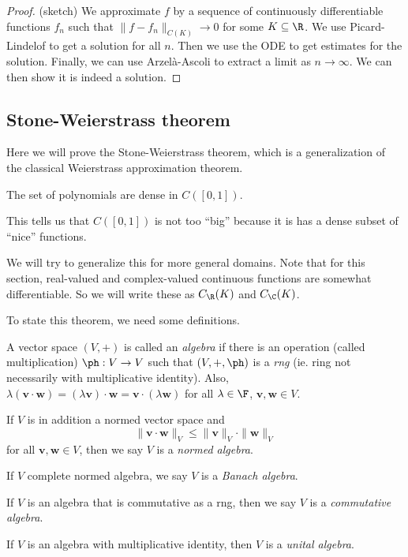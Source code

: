 \documentclass[a4paper]{article}
\begin{document}
\begin{proof}(sketch)
  We approximate $f$ by a sequence of continuously differentiable functions $f_n$ such that $\|f - f_n\|_{C(K)} \to 0$ for some $K\subseteq \R$. We use Picard-Lindelof to get a solution for all $n$. Then we use the ODE to get estimates for the solution. Finally, we can use Arzel\`a-Ascoli to extract a limit as $n \to \infty$. We can then show it is indeed a solution.
\end{proof}

\subsection{Stone-Weierstrass theorem}
Here we will prove the Stone-Weierstrass theorem, which is a generalization of the classical Weierstrass approximation theorem.
\begin{thm}
  The set of polynomials are dense in $C([0, 1])$.
\end{thm}
This tells us that $C([0, 1])$ is not too ``big'' because it is has a dense subset of ``nice'' functions.

We will try to generalize this for more general domains. Note that for this section, real-valued and complex-valued continuous functions are somewhat differentiable. So we will write these as $C_{\R}(K)$ and $C_{\C}(K)$.

To state this theorem, we need some definitions.

\begin{defi}[Algebra]
  A vector space $(V, +)$ is called an \emph{algebra} if there is an operation (called multiplication) $\ph: V \to V$ such that $(V, +, \ph)$ is a \emph{rng} (ie. ring not necessarily with multiplicative identity). Also, $\lambda(\mathbf{v}\cdot \mathbf{w}) = (\lambda \mathbf{v})\cdot \mathbf{w} = \mathbf{v}\cdot (\lambda \mathbf{w})$ for all $\lambda \in \F$, $\mathbf{v}, \mathbf{w} \in V$.

  If $V$ is in addition a normed vector space and
  \[
    \|\mathbf{v}\cdot \mathbf{w}\|_V \leq \|\mathbf{v}\|_V \cdot \|\mathbf{w}\|_V
  \]
  for all $\mathbf{v}, \mathbf{w} \in V$, then we say $V$ is a \emph{normed algebra}.

  If $V$ complete normed algebra, we say $V$ is a \emph{Banach algebra}.

  If $V$ is an algebra that is commutative as a rng, then we say $V$ is a \emph{commutative algebra}.

  If $V$ is an algebra with multiplicative identity, then $V$ is a \emph{unital algebra}.
\end{defi}
\end{document}
